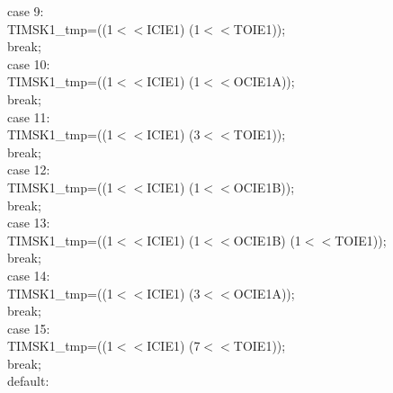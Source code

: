 \documentclass[titlepage, a4paper, 10pt, reqno, openany]{report}
\begin{document}
\begin{minipage}[t]{.35\linewidth}
\hspace*{1cm}		case 9: \\
\hspace*{1.5cm}			TIMSK1\_tmp=((1$<<$ICIE1) \textbar (1$<<$TOIE1)); \\
\hspace*{1.5cm}			break; \\
\hspace*{1cm}		case 10: \\
\hspace*{1.5cm}			TIMSK1\_tmp=((1$<<$ICIE1) \textbar (1$<<$OCIE1A)); \\
\hspace*{1.5cm}			break; \\
\hspace*{1cm}		case 11: \\
\hspace*{1.5cm}			TIMSK1\_tmp=((1$<<$ICIE1) \textbar (3$<<$TOIE1)); \\
\hspace*{1.5cm}			break; \\
\hspace*{1cm}		case 12: \\
\hspace*{1.5cm}			TIMSK1\_tmp=((1$<<$ICIE1) \textbar (1$<<$OCIE1B)); \\
\hspace*{1.5cm}			break; \\
\hspace*{1cm}		case 13: \\
\hspace*{1.5cm}			TIMSK1\_tmp=((1$<<$ICIE1) \textbar (1$<<$OCIE1B) \textbar (1$<<$TOIE1)); \\
\hspace*{1.5cm}			break; \\
\hspace*{1cm}		case 14: \\
\hspace*{1.5cm}			TIMSK1\_tmp=((1$<<$ICIE1) \textbar (3$<<$OCIE1A)); \\
\hspace*{1.5cm}			break; \\
\hspace*{1cm}		case 15: \\
\hspace*{1.5cm}			TIMSK1\_tmp=((1$<<$ICIE1) \textbar (7$<<$TOIE1)); \\
\hspace*{1.5cm}			break; \\
\hspace*{1cm}		default: \\

\end{minipage}
\end{document}

